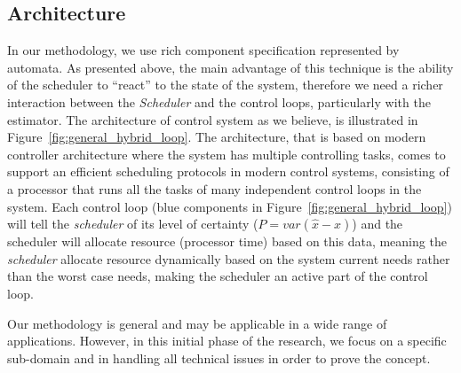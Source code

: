 \documentclass[ twoside, 12pt ]{article}
\begin{document}
\subsection{Architecture}

In our methodology, we use rich component specification represented by automata.
As presented above, the main advantage of this technique is the ability of the scheduler to ``react'' to the state of the system, therefore we need a richer interaction between the \textit{Scheduler} and the control loops, particularly with the estimator.
The architecture of control system as we believe, is illustrated in Figure~\ref{fig:general_hybrid_loop}.
The architecture, that is based on modern controller architecture where the system has multiple controlling tasks, comes to support an efficient scheduling protocols in modern control systems, consisting of a processor that runs all the tasks of many independent control loops in the system. 
Each control loop (blue components in Figure~\ref{fig:general_hybrid_loop}) will tell the \textit{scheduler} of its level of certainty ($P = var(\hat{x} - x)$) and the scheduler will allocate resource (processor time) based on this data, meaning the \textit{scheduler} allocate resource dynamically based on the system current needs rather than the worst case needs, making the scheduler an active part of the control loop.

Our methodology is general and may be applicable in a wide range of applications. However, in this initial phase of the research, we focus on a specific sub-domain and in handling all technical issues in order to prove the concept.
\end{document}
